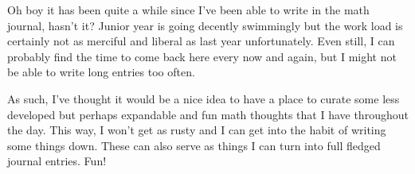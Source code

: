 Oh boy it has been quite a while since I've been able to write in the math
journal, hasn't it? Junior year is going decently swimmingly but the work load
is certainly not as merciful and liberal as last year unfortunately. Even
still, I can probably find the time to come back here every now and again, but
I might not  be able to write long entries too often.

As such, I've thought it would be a nice idea to have a place to curate some
less developed but perhaps expandable and fun math thoughts that I have
throughout the day. This way, I won't get as rusty and I can get into the habit
of writing some things down. These can also serve as things I can turn into
full fledged journal entries. Fun!

